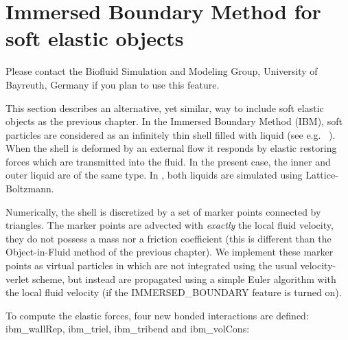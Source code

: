 %  
%   
%  
%  
%

\chapter{Immersed Boundary Method for soft elastic objects}
\label{sec:ibm}

\begin{citebox}
  Please contact the Biofluid Simulation and Modeling Group, University of Bayreuth, Germany if you plan to use this feature. 
\end{citebox}

This section describes an alternative, yet similar, way to include soft elastic objects as the previous chapter. In the Immersed Boundary Method (IBM), soft particles are considered as an infinitely thin shell filled with liquid (see e.g. ~). When the shell is deformed by an external flow it responds by elastic restoring forces which are transmitted into the fluid. In the present case, the inner and outer liquid are of the same type. In \es, both liquids are simulated using Lattice-Boltzmann. 

Numerically, the shell is discretized by a set of marker points connected by triangles. The marker points are advected with \textit{exactly} the local fluid velocity, they do not possess a mass nor a friction coefficient (this is different than the Object-in-Fluid method of the previous chapter). We implement these marker points as virtual particles in \es which are not integrated using the usual velocity-verlet scheme, but instead are propagated using a simple Euler algorithm with the local fluid velocity (if the IMMERSED_BOUNDARY feature is turned on).

To compute the elastic forces, four new bonded interactions are defined: ibm\_wallRep, ibm\_triel, ibm\_tribend and ibm\_volCons:

